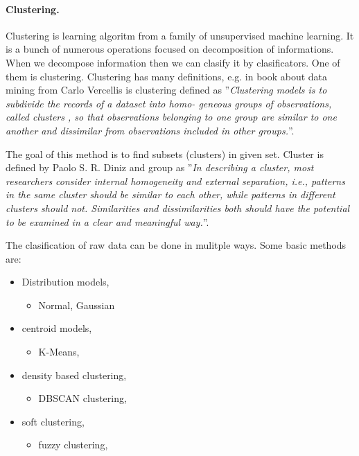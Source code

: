 	\paragraph{Clustering.}
	Clustering is learning algoritm from a family of unsupervised machine
	learning. It is a bunch of numerous operations focused on decomposition of
	informations. When we decompose information then we can clasify it by
	clasificators. One of them is clustering. Clustering has many definitions,
	e.g. in book about data mining from Carlo Vercellis
	\cite{doi:10.1002/9780470753866.ch12} is clustering defined as
	''\emph{Clustering models is to subdivide the records of a dataset into homo-
	geneous groups of observations, called clusters , so that observations
	belonging to one group are similar to one another and dissimilar from
	observations included in other groups.}''.


	The goal of this method is to find subsets (clusters) in given set. Cluster is
	defined by Paolo S. R. Diniz and group \cite{Lam20141115} as ''\emph{In
	describing a cluster, most researchers consider internal homogeneity and
	external separation, i.e., patterns in the same cluster should be similar to
	each other, while patterns in different clusters should not. Similarities and
	dissimilarities both should have the potential to be examined in a clear and
	meaningful way.}''.

	The clasification of raw data can be done in mulitple ways.
	Some basic methods are:
	\begin{itemize}
		\item Distribution models,
		\begin{itemize}
			\item Normal, Gaussian
		\end{itemize}
		\item centroid models,
		\begin{itemize}
			\item K-Means,
		\end{itemize}
		\item density based clustering,
		\begin{itemize}
			\item DBSCAN clustering,
		\end{itemize}
		\item soft clustering,
		\begin{itemize}
			\item fuzzy clustering,
		\end{itemize}
	\end{itemize}

